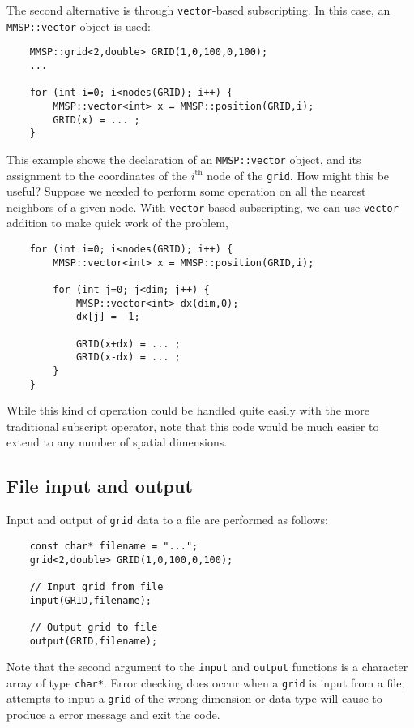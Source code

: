 The second alternative is through {\tt vector}-based subscripting.  In this case, an {\tt MMSP::vector} object is used:
\begin{shadebox}
\begin{verbatim}
    MMSP::grid<2,double> GRID(1,0,100,0,100);
    ...

    for (int i=0; i<nodes(GRID); i++) {
        MMSP::vector<int> x = MMSP::position(GRID,i);
        GRID(x) = ... ;
    }
\end{verbatim}
\end{shadebox}
This example shows the declaration of an {\tt MMSP::vector} object, and its assignment to the coordinates of the $i^\text{th}$ node of the {\tt grid}.  How might this be useful?  Suppose we needed to perform some operation on all the nearest neighbors of a given node.  With {\tt vector}-based subscripting, we can use {\tt vector} addition to make quick work of the problem,
\begin{shadebox}
\begin{verbatim}
    for (int i=0; i<nodes(GRID); i++) {
        MMSP::vector<int> x = MMSP::position(GRID,i);

        for (int j=0; j<dim; j++) {
            MMSP::vector<int> dx(dim,0);
            dx[j] =  1;

            GRID(x+dx) = ... ;
            GRID(x-dx) = ... ;
        }
    }
\end{verbatim}
\end{shadebox}
While this kind of operation could be handled quite easily with the more traditional subscript operator, note that this code would be much easier to extend to any number of spatial dimensions.

\subsection{File input and output}
Input and output of {\tt grid} data to a file are performed as follows:
\begin{shadebox}
\begin{verbatim}
    const char* filename = "...";
    grid<2,double> GRID(1,0,100,0,100);

    // Input grid from file
    input(GRID,filename);

    // Output grid to file
    output(GRID,filename);
\end{verbatim}
\end{shadebox}
Note that the second argument to the {\tt input} and {\tt output} functions is a character array of type {\tt char*}.  Error checking does occur when a {\tt grid} is input from a file; attempts to input a {\tt grid} of the wrong dimension or data type will cause \MMSP to produce a error message and exit the code.

